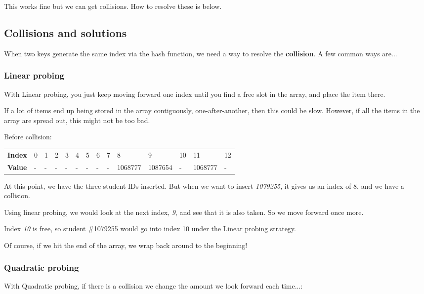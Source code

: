 This works fine but we can get collisions. How to resolve these is below.

\subsection*{Collisions and solutions}

When two keys generate the same index via the hash function, we need a way to resolve the {\bfseries collision}. A few common ways are...

\subsubsection*{Linear probing}

With Linear probing, you just keep moving forward one index until you find a free slot in the array, and place the item there.

If a lot of items end up being stored in the array contiguously, one-\/after-\/another, then this could be slow. However, if all the items in the array are spread out, this might not be too bad.

Before collision\+:

\tabulinesep=1mm
\begin{longtabu} spread 0pt [c]{*14{|X[-1]}|}
\hline
{\bf Index }&0 &1 &2 &3 &4 &5 &6 &7 &8 &9 &10 &11 &12  \\
{\bf Value }&-\/ &-\/ &-\/ &-\/ &-\/ &-\/ &-\/ &-\/ &1068777 &1087654 &-\/ &1068777 &-\/  \\
\end{longtabu}


At this point, we have the three student I\+Ds inserted. But when we want to insert {\itshape 1079255}, it gives us an index of 8, and we have a collision.

Using linear probing, we would look at the next index, {\itshape 9}, and see that it is also taken. So we move forward once more.

Index {\itshape 10} is free, so student \#1079255 would go into index 10 under the Linear probing strategy.

Of course, if we hit the end of the array, we wrap back around to the beginning!

\subsubsection*{Quadratic probing}

With Quadratic probing, if there is a collision we change the amount we look forward each time...\+:


